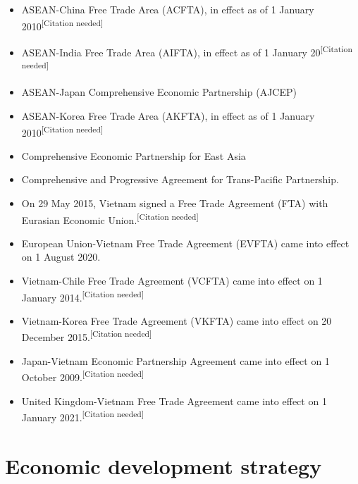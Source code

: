 \documentclass[openany]{book}
\begin{document}
    \begin{itemize}
        \vspace{-5pt}
                \item ASEAN-China Free Trade Area (ACFTA), in effect as of 1 January 2010\textsuperscript{[Citation needed]}
                \item ASEAN-India Free Trade Area (AIFTA), in effect as of 1 January 20\textsuperscript{[Citation needed]}
                \item ASEAN-Japan Comprehensive Economic Partnership (AJCEP)
                \item ASEAN-Korea Free Trade Area (AKFTA), in effect as of 1 January 2010\textsuperscript{[Citation needed]}
                \item Comprehensive Economic Partnership for East Asia
                \item Comprehensive and Progressive Agreement for Trans-Pacific Partnership.
                \item On 29 May 2015, Vietnam signed a Free Trade Agreement (FTA) with Eurasian Economic Union.\textsuperscript{[Citation needed]}
                \item European Union-Vietnam Free Trade Agreement (EVFTA) came into effect on 1 August 2020.
                \item Vietnam-Chile Free Trade Agreement (VCFTA) came into effect on 1 January 2014.\textsuperscript{[Citation needed]}
                \item Vietnam-Korea Free Trade Agreement (VKFTA) came into effect on 20 December 2015.\textsuperscript{[Citation needed]}
                \item Japan-Vietnam Economic Partnership Agreement came into effect on 1 October 2009.\textsuperscript{[Citation needed]}
                \item United Kingdom-Vietnam Free Trade Agreement came into effect on 1 January 2021.\textsuperscript{[Citation needed]}
    \end{itemize}    


    
\chapter{Economic development strategy}
\end{document}
